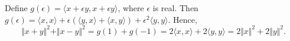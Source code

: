 \documentclass[12pt]{article}
\begin{document}
Define $g(\epsilon) = \langle x+\epsilon y , x + \epsilon y\rangle$, where $\epsilon$ is real.
Then $g(\epsilon) = \langle x,x\rangle + \epsilon (\langle y,x\rangle + \langle x,y\rangle) + \epsilon^2 \langle y,y\rangle .$
Hence,  
$$ \Vert x + y \Vert ^2  + \Vert x - y \Vert ^2 = g(1) + g(-1) = 2\langle x,x\rangle + 2\langle y,y\rangle  = 2 \Vert x \Vert ^2 + 2 \Vert y \Vert ^2.$$
\end{document}
